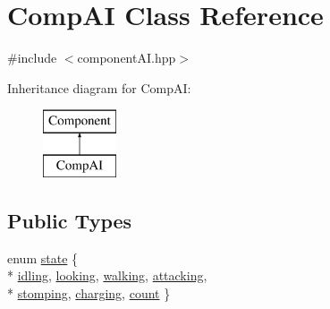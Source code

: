 \hypertarget{class_comp_a_i}{\section{Comp\-A\-I Class Reference}
\label{class_comp_a_i}
}


{\ttfamily \#include $<$component\-A\-I.\-hpp$>$}

Inheritance diagram for Comp\-A\-I\-:\begin{figure}[H]
\begin{center}
\leavevmode
\includegraphics[height=2.000000cm]{class_comp_a_i}
\end{center}
\end{figure}
\subsection*{Public Types}
\begin{DoxyCompactItemize}
\item 
enum \hyperlink{class_comp_a_i_a23de91b299442dbd0183318ae46fc39c}{state} \{ \\*
\hyperlink{class_comp_a_i_a23de91b299442dbd0183318ae46fc39ca7cb793e2b6a5c11d5b9423a9e37acca9}{idling}, 
\hyperlink{class_comp_a_i_a23de91b299442dbd0183318ae46fc39caf0cbaf25fb632bacbb2cfc2c0410cf33}{looking}, 
\hyperlink{class_comp_a_i_a23de91b299442dbd0183318ae46fc39ca1112bd8f5e207442c6af117378cad790}{walking}, 
\hyperlink{class_comp_a_i_a23de91b299442dbd0183318ae46fc39ca67a4fc58227af4277691a01cc047aa6b}{attacking}, 
\\*
\hyperlink{class_comp_a_i_a23de91b299442dbd0183318ae46fc39ca0c9089f7508c33476086582ac4dd87fc}{stomping}, 
\hyperlink{class_comp_a_i_a23de91b299442dbd0183318ae46fc39ca03776d42c4a242bb3076e03eaf112273}{charging}, 
\hyperlink{class_comp_a_i_a23de91b299442dbd0183318ae46fc39cab97c84b91cda0ada8a773d6ce7322218}{count}
 \}
\end{DoxyCompactItemize}
